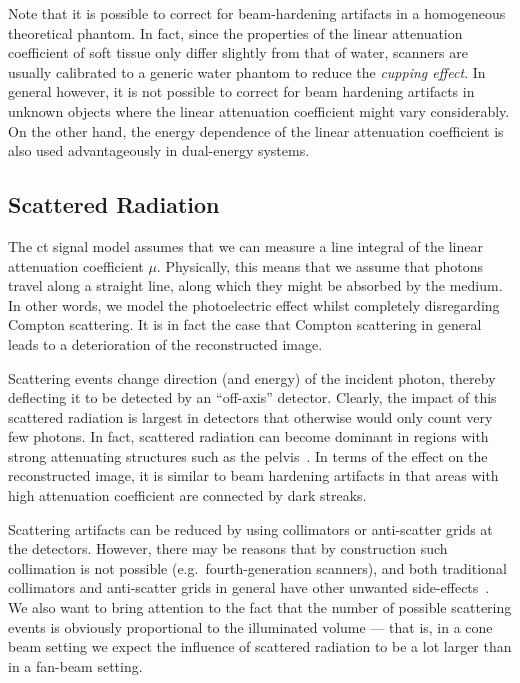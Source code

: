 \documentclass[../ml-ct.tex]{subfiles}
\begin{document}
Note that it is possible to correct for beam-hardening artifacts in a homogeneous theoretical phantom.
In fact, since the properties of the linear attenuation coefficient of soft tissue only differ slightly from that of water, scanners are usually calibrated to a generic water phantom to reduce the \emph{cupping effect}.
In general however, it is not possible to correct for beam hardening artifacts in unknown objects where the linear attenuation coefficient might vary considerably.
On the other hand, the energy dependence of the linear attenuation coefficient is also used advantageously in dual-energy systems.
\subsection{Scattered Radiation}
The \gls{ct} signal model assumes that we can measure a line integral of the linear attenuation coefficient \( \mu \).
Physically, this means that we assume that photons travel along a straight line, along which they might be absorbed by the medium.
In other words, we model the photoelectric effect whilst completely disregarding Compton scattering.
It is in fact the case that Compton scattering in general leads to a deterioration of the reconstructed image.

Scattering events change direction (and energy) of the incident photon, thereby deflecting it to be detected by an \enquote{off-axis} detector.
Clearly, the impact of this scattered radiation is largest in detectors that otherwise would only count very few photons.
In fact, scattered radiation can become dominant in regions with strong attenuating structures such as the pelvis~\cite{morneburg_bildgebende_1995}.
In terms of the effect on the reconstructed image, it is similar to beam hardening artifacts in that areas with high attenuation coefficient are connected by dark streaks.

Scattering artifacts can be reduced by using collimators or anti-scatter grids at the detectors.
However, there may be reasons that by construction such collimation is not possible (e.g.\ fourth-generation scanners), and both traditional collimators and anti-scatter grids in general have other unwanted side-effects~\cite{siewerdsen_influence_2004}.
We also want to bring attention to the fact that the number of possible scattering events is obviously proportional to the illuminated volume --- that is, in a cone beam setting we expect the influence of scattered radiation to be a lot larger than in a fan-beam setting.
\end{document}
